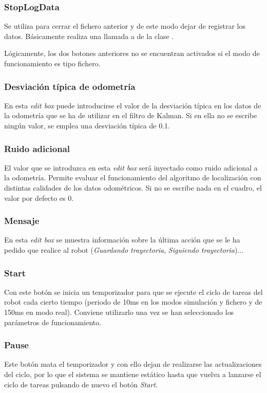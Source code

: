 \subsubsection{StopLogData}
Se utiliza para cerrar el fichero anterior y de este modo dejar de registrar los datos. Básicamente realiza una llamada a  de la clase .

\vspace{0.2cm}
\noindent
Lógicamente, los dos botones anteriores no se encuentran activados si el modo de funcionamiento es tipo fichero.

\subsubsection{Desviación típica de odometría}
En esta \emph{edit box} puede introducirse el valor de la desviación típica en los datos de la odometría que se ha de utilizar en el filtro de Kalman. Si en ella no se escribe ningún valor, se emplea una desviación típica de 0.1.

\subsubsection{Ruido adicional}
El valor que se introduzca en esta \emph{edit box} será inyectado como ruido adicional a la odometría. Permite evaluar el funcionamiento del algoritmo de localización con distintas calidades de los datos odométricos. Si no se escribe nada en el cuadro, el valor por defecto es 0.

\subsubsection{Mensaje}
En esta \emph{edit box} se muestra información sobre la última acción que se le ha pedido que realice al robot (\emph{Guardando trayectoria}, \emph{Siguiendo trayectoria})...

\subsubsection{Start}
Con este botón se inicia un temporizador para que se ejecute el ciclo de tareas del robot cada cierto tiempo (periodo de 10ms en los modos simulación y fichero y de 150ms en modo real). Conviene utilizarlo una vez se han seleccionado los parámetros de funcionamiento.

\subsubsection{Pause}
Este botón mata el temporizador y con ello dejan de realizarse las actualizaciones del ciclo, por lo que el sistema se mantiene estático hasta que vuelva a lanzarse el ciclo de tareas pulsando de nuevo el botón \emph{Start}.

